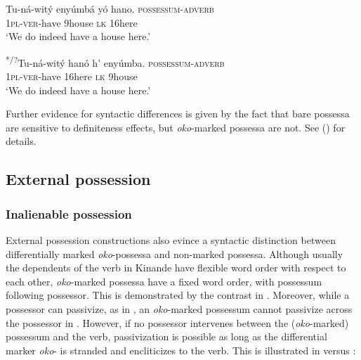 \documentclass[output=paper]{langscibook}
\begin{document}
\ex \label{ex:schneider:PossessionNoDifMarking}
\begin{xlist}

\ex \label{ex:schneider:PossessumAdverbNoDifMarking}
\gll Tu-ná-wit\'y enyúmbá y\'o hano. \hspace{1.7cm} \textsc{possessum-adverb} \\
\textsc{1pl-ver}-have 9house \textsc{lk} 16here \\ 
\glt `We do indeed have a house here.'


\ex \label{ex:schneider:AdverbPossessumNoDifMarking}
\gll \textsuperscript{*/?}Tu-ná-wit\'y han\'o  h' enyúmba. \hspace{1.6cm} \textsc{possessum-adverb}  \\
\textsc{1pl-ver}-have 16here  \textsc{lk} 9house  \\
\glt `We do indeed have a house here.'

\end{xlist}

\z


Further evidence for syntactic differences is given by the fact that bare possessa are sensitive to definiteness effects, but \textit{oko}-marked possessa are not. See \citeauthor{SchneiderZiogaMutaka2019a} (\citeyear{SchneiderZiogaMutaka2019a}) for details. 

\subsection{External possession}\label{sec:schneider:subsection4.3} 

\subsubsection{Inalienable possession}\label{sec:schneider:subsection4.3.1}

External possession constructions also evince a syntactic distinction between differentially marked \textit{oko}-possessa and non-marked possessa. Although usually the dependents of the verb in Kinande have flexible word order with respect to each other, \textit{oko}-marked possessa have a fixed word order, with possessum following possessor. This is demonstrated by the contrast in . Moreover, while a possessor can passivize, as in , an \textit{oko}-marked possessum cannot passivize across the possessor in . However, if no possessor intervenes between the (\textit{oko}-marked) possessum and the verb, passivization is possible as long as the differential marker \textit{oko}- is stranded and encliticizes to the verb. This is illustrated in  versus :
\end{document}
